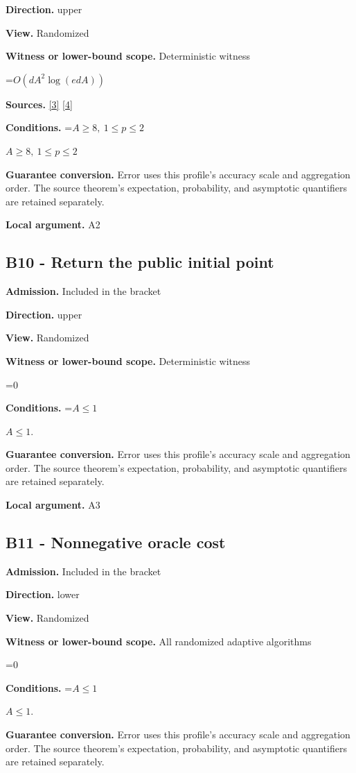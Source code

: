 \documentclass[10pt,a4paper]{article}
\newcommand{\AtlasMath}[1]{\par\begingroup\centering\setbox0=\hbox{$\displaystyle #1$}\ifdim\wd0>1.4\linewidth\typeout{ATLAS WIDE FORMULA: \the\wd0}\fi\ifdim\wd0>\linewidth\resizebox{\linewidth}{!}{\box0}\else\box0\fi\par\endgroup}
\newcommand{\AtlasInlineMath}[1]{\begingroup\setbox0=\hbox{$#1$}\ifdim\wd0>.4\linewidth\endgroup\AtlasMath{#1}\else\endgroup$#1$\fi}
\begin{document}
\textbf{Direction.} upper

\textbf{View.} Randomized

\textbf{Witness or lower-bound scope.} Deterministic witness

\AtlasMath{O(dA^2\log(edA))}
\textbf{Sources.} \href{https://arxiv.org/html/2607.16558v2}{[3]} \href{https://www.mathnet.ru/php/archive.phtml?jrnid=mzm&option_lang=eng&paperid=1697&wshow=paper}{[4]}

\textbf{Conditions.} \AtlasInlineMath{A\ge8,\ 1\le p\le2}

\textbf{Guarantee conversion.} Error uses this profile's accuracy scale and aggregation order. The source theorem's expectation, probability, and asymptotic quantifiers are retained separately.

\textbf{Local argument.} A2

\subsection{B10 - Return the public initial point}
\textbf{Admission.} Included in the bracket

\textbf{Direction.} upper

\textbf{View.} Randomized

\textbf{Witness or lower-bound scope.} Deterministic witness

\AtlasMath{0}
\textbf{Conditions.} \AtlasInlineMath{A\le1}.

\textbf{Guarantee conversion.} Error uses this profile's accuracy scale and aggregation order. The source theorem's expectation, probability, and asymptotic quantifiers are retained separately.

\textbf{Local argument.} A3

\subsection{B11 - Nonnegative oracle cost}
\textbf{Admission.} Included in the bracket

\textbf{Direction.} lower

\textbf{View.} Randomized

\textbf{Witness or lower-bound scope.} All randomized adaptive algorithms

\AtlasMath{0}
\textbf{Conditions.} \AtlasInlineMath{A\le1}.

\textbf{Guarantee conversion.} Error uses this profile's accuracy scale and aggregation order. The source theorem's expectation, probability, and asymptotic quantifiers are retained separately.
\end{document}
